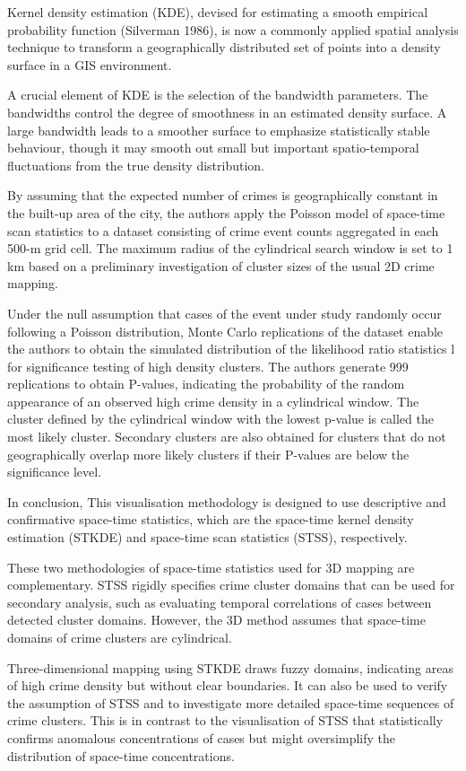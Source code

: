 \documentclass[11pt,letterpaper,english]{article}
\begin{document}
Kernel density estimation (KDE), devised for estimating a smooth empirical probability function (Silverman 1986), is now a commonly applied spatial analysis technique to transform a geographically distributed set of points into a density surface in a GIS environment.

A crucial element of KDE is the selection of the bandwidth parameters. The bandwidths control the degree of smoothness in an estimated density surface. A large bandwidth leads to a smoother surface to emphasize statistically stable behaviour, though it may smooth out small but important spatio-temporal fluctuations from the true density distribution. 

By assuming that the expected number of crimes is geographically constant in the built-up area of the city, the authors apply the Poisson model of space-time scan statistics to a dataset consisting of crime event counts aggregated in each 500-m grid cell. The maximum radius of the cylindrical search window is set to 1 km based on a preliminary investigation of cluster sizes of the usual 2D crime mapping.

Under the null assumption that cases of the event under study randomly occur following a Poisson distribution, Monte Carlo replications of the dataset enable the authors to obtain the simulated distribution of the likelihood ratio statistics l for significance testing of high density clusters. The authors generate 999 replications to obtain P-values, indicating the probability of the random appearance of an observed high crime density in a cylindrical window. The cluster defined by the cylindrical window with the lowest p-value is called the most likely cluster. Secondary clusters are also obtained for clusters that do not geographically overlap more likely clusters if their P-values are below the significance level. 


In conclusion, This visualisation methodology is designed to use descriptive and confirmative space-time statistics, which are the space-time kernel density estimation (STKDE) and space-time scan statistics (STSS), respectively. 

These two methodologies of space-time statistics used for 3D mapping are complementary. STSS rigidly specifies crime cluster domains that can be used for secondary analysis, such as evaluating temporal correlations of cases between detected cluster domains. 
However, the 3D method assumes that space-time domains of crime clusters are cylindrical. 

Three-dimensional mapping using STKDE draws fuzzy domains, indicating areas of high crime density but without clear boundaries. It can also be used to verify the assumption of STSS and to investigate more detailed space-time sequences of crime clusters. This is in contrast to the visualisation of STSS that statistically confirms anomalous concentrations of cases but might oversimplify the distribution of space-time concentrations.



 
\end{document}
